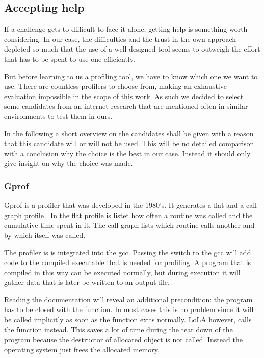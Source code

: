 \subsection{Accepting help}
If a challenge gets to difficult to face it alone, getting help is something worth considering. In our case, the difficulties and the trust in the own approach depleted so much that the use of a well designed tool seems to outweigh the effort that has to be spent to use one efficiently.

But before learning to us a profiling tool, we have to know which one we want to use. There are countless profilers to choose from, making an exhaustive evaluation impossible in the scope of this work. As such we decided to select some candidates from an internet research that are mentioned often in similar environments to test them in ours.

In the following a short overview on the candidates shall be given with a reason that this candidate will or will not be used. This will be no detailed comparison with a conclusion why the choice is the best in our case. Instead it should only give insight on why the choice was made.

\subsubsection{Gprof}
Gprof is a profiler that was developed in the 1980's. It generates a flat and a call graph profile \cite{graham1982gprof}. In the flat profile is listet how often a routine was called and the cumulative time spent in it. The call graph lists which routine calls another and by which itself was called.

The profiler is is integrated into the gcc. Passing the  switch to the gcc will add code to the compiled executable that is needed for profiling. A program that is compiled in this way can be executed normally, but during execution it will gather data that is later be written to an output file.

Reading the documentation will reveal an additional precondition: the program has to be closed with the  function. In most cases this is no problem since it will be called implicitly as soon as the  function exits normally. LoLA however, calls the  function instead. This saves a lot of time during the tear down of the program because the destructor of allocated object is not called. Instead the operating system just frees the allocated memory.

